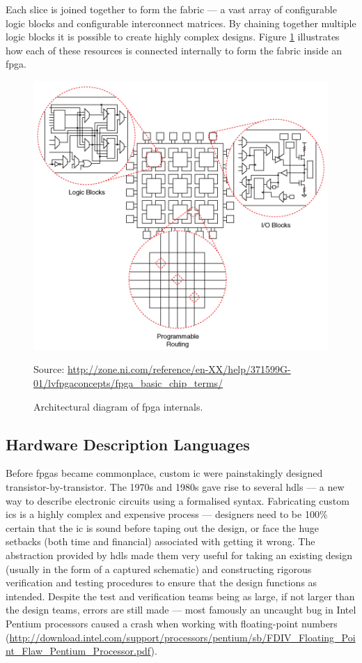 Each slice is joined together to form the fabric --- a vast array of configurable logic blocks and configurable interconnect matrices. By chaining together multiple logic blocks it is possible to create highly complex designs. Figure \ref{fig:fpga_diagram} illustrates how each of these resources is connected internally to form the fabric inside an \gls{fpga}. 

\begin{figure}
  \centering
  \includegraphics[width=1\textwidth]{./img/fpga_arch_diagram.png}\par
Source: \url{http://zone.ni.com/reference/en-XX/help/371599G-01/lvfpgaconcepts/fpga_basic_chip_terms/}
  \caption{Architectural diagram of \gls{fpga} internals.}
  \label{fig:fpga_diagram}
\end{figure}

\subsection{Hardware Description Languages}
Before \glspl{fpga} became commonplace, custom \gls{ic} were painstakingly designed transistor-by-transistor. The 1970s and 1980s gave rise to several \glspl{hdl} --- a new way to describe electronic circuits using a formalised syntax. Fabricating custom \glspl{ic} is a highly complex and expensive process --- designers need to be 100\% certain that the \gls{ic} is sound before taping out the design, or face the huge setbacks (both time and financial) associated with getting it wrong. The abstraction provided by \glspl{hdl} made them very useful for taking an existing design (usually in the form of a captured schematic) and constructing rigorous verification and testing procedures to ensure that the design functions as intended. Despite the test and verification teams being as large, if not larger than the design teams, errors are still made --- most famously an uncaught bug in Intel Pentium processors caused a crash when working with floating-point numbers (\url{http://download.intel.com/support/processors/pentium/sb/FDIV_Floating_Point_Flaw_Pentium_Processor.pdf}). 

